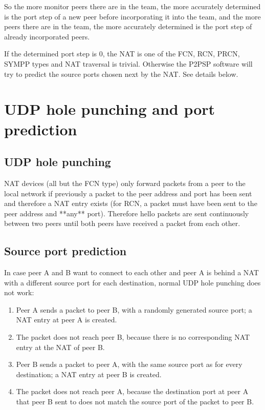 \documentclass{article}
\begin{document}
So the more monitor peers there are in the team, the more accurately
determined is the port step of a new peer before incorporating it into
the team, and the more peers there are in the team, the more
accurately determined is the port step of already incorporated peers.

If the determined port step is 0, the NAT is one of the FCN, RCN,
PRCN, SYMPP types and NAT traversal is trivial. Otherwise the P2PSP
software will try to predict the source ports chosen next by the
NAT. See details below.

\section{UDP hole punching and port prediction}

\subsection{UDP hole punching}

NAT devices (all but the FCN type) only forward packets from a peer to
the local network if previously a packet to the peer address and port
has been sent and therefore a NAT entry exists (for RCN, a packet must
have been sent to the peer address and **any** port). Therefore hello
packets are sent continuously between two peers until both peers have
received a packet from each other.

\subsection{Source port prediction}

In case peer A and B want to connect to each other and peer A is
behind a NAT with a different source port for each destination, normal
UDP hole punching does not work:

\begin{enumerate}

\item Peer A sends a packet to peer B, with a randomly generated source
  port; a NAT entry at peer A is created.

\item The packet does not reach peer B, because there is no corresponding
  NAT entry at the NAT of peer B.

\item Peer B sends a packet to peer A, with the same source port as for
  every destination; a NAT entry at peer B is created.

\item The packet does not reach peer A, because the destination port at
  peer A that peer B sent to does not match the source port of the
  packet to peer B.
  
\end{enumerate}
\end{document}
